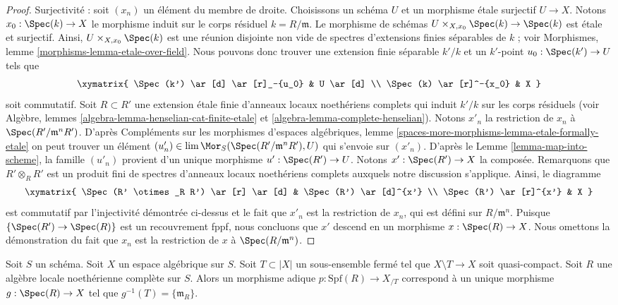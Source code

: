 \begin{proof}
\medskip\noindent
Surjectivité : soit $(x_n)$ un élément du membre de droite.
Choisissons un schéma $U$ et un morphisme \'etale surjectif $U \to X$. 
Notons $x_0 : \Spec(k) \to X$ le morphisme induit sur le corps résiduel
$k = R/\mathfrak m$. Le morphisme de schémas
$U \times_{X, x_0} \Spec(k) \to \Spec(k)$ est \'etale et surjectif.
Ainsi, $U \times_{X, x_0} \Spec(k)$ est une réunion disjointe non vide de spectres
d'extensions finies séparables de $k$ ; voir
Morphismes, lemme \ref{morphisms-lemma-etale-over-field}.
Nous pouvons donc trouver une extension finie séparable $k'/k$
et un $k'$-point $u_0 : \Spec(k') \to U$ tels que
$$
\xymatrix{
\Spec(k') \ar[d] \ar[r]_-{u_0} & U \ar[d] \\
\Spec(k) \ar[r]^-{x_0} & X
}
$$
soit commutatif. Soit $R \subset R'$ une extension \'etale finie d'anneaux locaux
noethériens complets qui induit $k'/k$ sur les corps résiduels
(voir Algèbre, lemmes \ref{algebra-lemma-henselian-cat-finite-etale} et
\ref{algebra-lemma-complete-henselian}). Notons $x'_n$ la restriction
de $x_n$ à $\Spec(R'/\mathfrak m^nR')$. D'après
Compléments sur les morphismes d'espaces algébriques, lemme
\ref{spaces-more-morphisms-lemma-etale-formally-etale}
on peut trouver un élément
$(u'_n) \in \lim \Mor_S(\Spec(R'/\mathfrak m^nR'), U)$
qui s'envoie sur $(x'_n)$. D'après le Lemme \ref{lemma-map-into-scheme},
la famille $(u'_n)$ provient d'un unique
morphisme $u' : \Spec(R') \to U$. Notons $x' : \Spec(R') \to X$ la
composée. Remarquons que $R' \otimes_R R'$ est un produit fini de spectres d'anneaux
locaux noethériens complets auxquels notre discussion s'applique.
Ainsi, le diagramme
$$
\xymatrix{
\Spec(R' \otimes_R R') \ar[r] \ar[d] & \Spec(R') \ar[d]^{x'} \\
\Spec(R') \ar[r]^{x'} & X
}
$$
est commutatif par l'injectivité démontrée ci-dessus et le fait que
$x'_n$ est la restriction de $x_n$, qui est défini sur $R/\mathfrak m^n$.
Puisque $\{\Spec(R') \to \Spec(R)\}$ est un recouvrement fppf, nous concluons
que $x'$ descend en un morphisme $x : \Spec(R) \to X$.
Nous omettons la démonstration du fait que $x_n$ est la restriction de $x$ à
$\Spec(R/\mathfrak m^n)$.
\end{proof}

\begin{lemma}
\label{lemma-adic-into-completion}
Soit $S$ un schéma. Soit $X$ un espace algébrique sur $S$.
Soit $T \subset |X|$ un sous-ensemble fermé tel que
$X \setminus T \to X$ soit quasi-compact. Soit $R$ une algèbre locale
noethérienne complète sur $S$. Alors un morphisme adique $p : \text{Spf}(R) \to X_{/T}$
correspond à un unique morphisme $g : \Spec(R) \to X$ tel
que $g^{-1}(T) = \{\mathfrak m_R\}$. 
\end{lemma}

